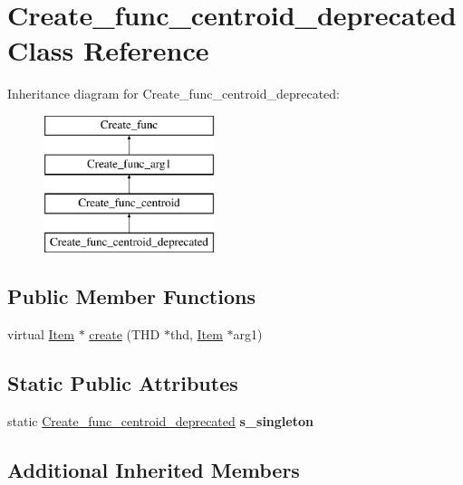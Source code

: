 \hypertarget{classCreate__func__centroid__deprecated}{}\section{Create\+\_\+func\+\_\+centroid\+\_\+deprecated Class Reference}
\label{classCreate__func__centroid__deprecated}
Inheritance diagram for Create\+\_\+func\+\_\+centroid\+\_\+deprecated\+:\begin{figure}[H]
\begin{center}
\leavevmode
\includegraphics[height=4.000000cm]{classCreate__func__centroid__deprecated}
\end{center}
\end{figure}
\subsection*{Public Member Functions}
\begin{DoxyCompactItemize}
\item 
virtual \mbox{\hyperlink{classItem}{Item}} $\ast$ \mbox{\hyperlink{classCreate__func__centroid__deprecated_aceb672ea4e46c9730c4714c804333d5b}{create}} (T\+HD $\ast$thd, \mbox{\hyperlink{classItem}{Item}} $\ast$arg1)
\end{DoxyCompactItemize}
\subsection*{Static Public Attributes}
\begin{DoxyCompactItemize}
\item 
\mbox{\label{classCreate__func__centroid__deprecated_a14512e59c74fc25aee7bc3513ab25ca2}} 
static \mbox{\hyperlink{classCreate__func__centroid__deprecated}{Create\+\_\+func\+\_\+centroid\+\_\+deprecated}} {\bfseries s\+\_\+singleton}
\end{DoxyCompactItemize}
\subsection*{Additional Inherited Members}


